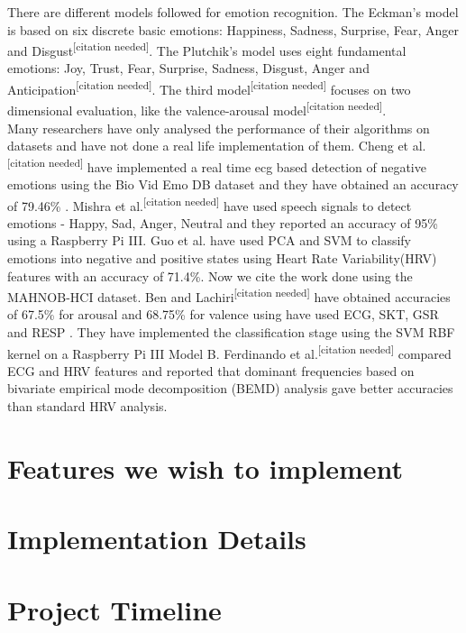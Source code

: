 \documentclass[11pt]{article}
\theoremstyle{definition}
\begin{document}
There are different models followed for emotion recognition. The Eckman's model is based on six discrete basic emotions: Happiness, Sadness, Surprise, Fear, Anger and Disgust\textsuperscript{[citation needed]}. The Plutchik's model uses eight fundamental emotions: Joy, Trust, Fear, Surprise, Sadness, Disgust, Anger and Anticipation\textsuperscript{[citation needed]}. The third model\textsuperscript{[citation needed]} focuses on two dimensional evaluation, like the valence-arousal model\textsuperscript{[citation needed]}.\\

Many researchers have only analysed the performance of their algorithms on datasets and have not done a real life implementation of them.
Cheng et al.\textsuperscript{[citation needed]} have implemented a real time ecg based detection of negative emotions using the Bio Vid Emo DB dataset and they have obtained an accuracy of 79.46\% . 
Mishra et al.\textsuperscript{[citation needed]} have used speech signals to detect emotions - Happy, Sad, Anger, Neutral and they reported an accuracy of 95\% using a Raspberry Pi III.
Guo et al. have used PCA and SVM to classify emotions into negative and positive states using Heart Rate Variability(HRV) features with an accuracy of 71.4\%.
Now we cite the work done using the MAHNOB-HCI dataset. 
Ben and Lachiri\textsuperscript{[citation needed]} have obtained accuracies of 67.5\% for arousal and 68.75\% for valence using have used ECG, SKT, GSR and RESP . They have implemented the classification stage using the SVM RBF kernel on a Raspberry Pi III Model B.
Ferdinando et al.\textsuperscript{[citation needed]} compared ECG and HRV features and reported that dominant frequencies based on
 bivariate empirical mode decomposition (BEMD) analysis gave better accuracies than standard HRV analysis.
    
  \section{Features we wish to implement}

  \section{Implementation Details}

  \section{Project Timeline}
  
\end{document}
